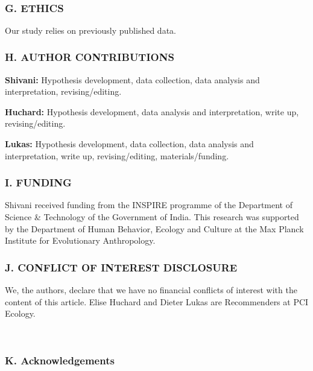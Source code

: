 \documentclass[]{article}
\begin{document}
~

\hypertarget{g.-ethics}{%
\subsubsection{G. ETHICS}\label{g.-ethics}}

Our study relies on previously published data.

\hypertarget{h.-author-contributions}{%
\subsubsection{H. AUTHOR CONTRIBUTIONS}\label{h.-author-contributions}}

\textbf{Shivani:} Hypothesis development, data collection, data analysis
and interpretation, revising/editing.

\textbf{Huchard:} Hypothesis development, data analysis and
interpretation, write up, revising/editing.

\textbf{Lukas:} Hypothesis development, data collection, data analysis
and interpretation, write up, revising/editing, materials/funding.

\hypertarget{i.-funding}{%
\subsubsection{I. FUNDING}\label{i.-funding}}

Shivani received funding from the INSPIRE programme of the Department of
Science \& Technology of the Government of India. This research was
supported by the Department of Human Behavior, Ecology and Culture at
the Max Planck Institute for Evolutionary Anthropology.

\hypertarget{j.-conflict-of-interest-disclosure}{%
\subsubsection{J. CONFLICT OF INTEREST
DISCLOSURE}\label{j.-conflict-of-interest-disclosure}}

We, the authors, declare that we have no financial conflicts of interest
with the content of this article. Elise Huchard and Dieter Lukas are
Recommenders at PCI Ecology.

~

\hypertarget{k.-acknowledgements}{%
\subsubsection{K. Acknowledgements}\label{k.-acknowledgements}}
\end{document}
